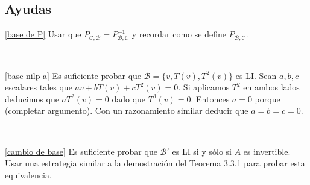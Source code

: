 \documentclass[12pt]{amsart}
\begin{document}
\subsection*{Ayudas}

\eqref{base de P} Usar que $P_{\mathcal{C},\mathcal{B}}=P_{\mathcal{B},\mathcal{C}}^{-1}$ y recordar como se define $P_{\mathcal{B},\mathcal{C}}$.

\

\eqref{base nilp a} Es suficiente probar que $\mathcal{B}=\{v, T(v), T^2(v)\}$ es LI. Sean $a,b,c$ escalares tales que $av+bT(v)+cT^2(v)=0$. Si aplicamos $T^2$ en ambos lados deducimos que $aT^2(v)=0$ dado que $T^3(v)=0$. Entonces $a=0$ porque (completar argumento). Con un razonamiento similar deducir que $a=b=c=0$.

\

\eqref{cambio de base} Es suficiente probar que $\mathcal{B}'$ es LI si y s\'olo si $A$ es invertible. Usar una estrategia similar a la demostraci\'on del Teorema 3.3.1 para probar esta equivalencia.















\end{document}
